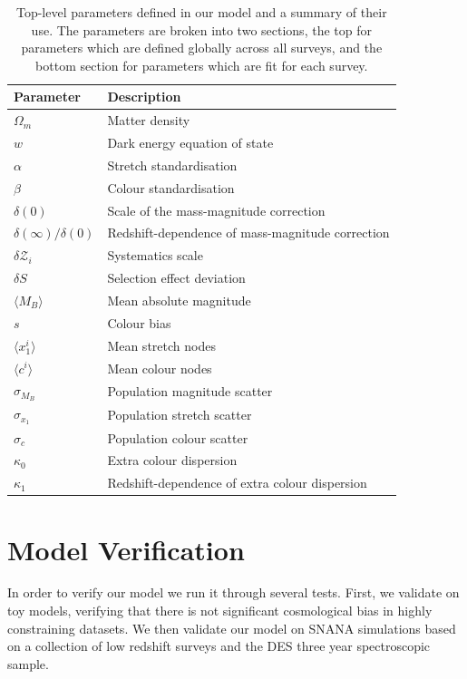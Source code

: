 \documentclass[a4paper,fleqn,usenatbib]{mnras}
\begin{document}
\begin{table}
	\centering
	\caption{Top-level parameters defined in our model and a summary of their use. The parameters are broken into two sections, the top for parameters which are defined globally across all surveys, and the bottom section for parameters which are fit for each survey.}
	\label{tab:param_summary}
	\begin{tabular}{ll}
		\hline
		Parameter & Description \\
		\hline
		$\Omega_m$  & Matter density  \\
		$w$  &  Dark energy equation of state  \\
		$\alpha$ & Stretch standardisation   \\
		$\beta$         &  Colour standardisation   \\
		$\delta(0)$ & Scale of the mass-magnitude correction\\
		$\delta(\infty)/\delta(0)$ & Redshift-dependence of mass-magnitude correction\\
		$\delta\mathcal{Z}_i$ & Systematics scale\\
		$\delta S$ & Selection effect deviation \\
		$\langle M_B \rangle$ & Mean absolute magnitude \\
		$s$ & Colour bias\\
		\hline
		$\langle x_1^i \rangle$ & Mean stretch nodes\\
		$\langle c^i \rangle$ & Mean colour nodes\\
		$\sigma_{M_B}$ & Population magnitude scatter \\
		$\sigma_{x_1}$ & Population stretch scatter \\
		$\sigma_{c}$ & Population colour scatter \\
		$\kappa_{0}$ & Extra colour dispersion\\
		$\kappa_{1}$ & Redshift-dependence of extra colour dispersion\\
		\hline
	\end{tabular}
\end{table}





\section{Model Verification}
\label{sec:verification}

In order to verify our model we run it through several tests. First, we validate on toy models, verifying that there is not significant cosmological bias in highly constraining datasets. We then validate our model on SNANA simulations based on a collection of low redshift surveys and the DES three year spectroscopic sample.
\end{document}
